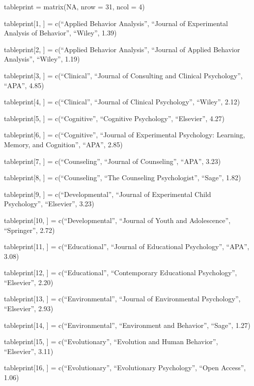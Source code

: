 \documentclass[english,man]{apa6}
\theoremstyle{definition}
\theoremstyle{definition}
\theoremstyle{definition}
\theoremstyle{remark}
\begin{document}
tableprint = matrix(NA, nrow = 31, ncol = 4)

tableprint{[}1, {]} = c(\enquote{Applied Behavior Analysis},
\enquote{Journal of Experimental Analysis of Behavior}, \enquote{Wiley},
1.39)

tableprint{[}2, {]} = c(\enquote{Applied Behavior Analysis},
\enquote{Journal of Applied Behavior Analysis}, \enquote{Wiley}, 1.19)

tableprint{[}3, {]} = c(\enquote{Clinical}, \enquote{Journal of
Consulting and Clinical Psychology}, \enquote{APA}, 4.85)

tableprint{[}4, {]} = c(\enquote{Clinical}, \enquote{Journal of Clinical
Psychology}, \enquote{Wiley}, 2.12)

tableprint{[}5, {]} = c(\enquote{Cognitive}, \enquote{Cognitive
Psychology}, \enquote{Elsevier}, 4.27)

tableprint{[}6, {]} = c(\enquote{Cognitive}, \enquote{Journal of
Experimental Psychology: Learning, Memory, and Cognition},
\enquote{APA}, 2.85)

tableprint{[}7, {]} = c(\enquote{Counseling}, \enquote{Journal of
Counseling}, \enquote{APA}, 3.23)

tableprint{[}8, {]} = c(\enquote{Counseling}, \enquote{The Counseling
Psychologist}, \enquote{Sage}, 1.82)

tableprint{[}9, {]} = c(\enquote{Developmental}, \enquote{Journal of
Experimental Child Psychology}, \enquote{Elsevier}, 3.23)

tableprint{[}10, {]} = c(\enquote{Developmental}, \enquote{Journal of
Youth and Adolescence}, \enquote{Springer}, 2.72)

tableprint{[}11, {]} = c(\enquote{Educational}, \enquote{Journal of
Educational Psychology}, \enquote{APA}, 3.08)

tableprint{[}12, {]} = c(\enquote{Educational}, \enquote{Contemporary
Educational Psychology}, \enquote{Elsevier}, 2.20)

tableprint{[}13, {]} = c(\enquote{Environmental}, \enquote{Journal of
Environmental Psychology}, \enquote{Elsevier}, 2.93)

tableprint{[}14, {]} = c(\enquote{Environmental}, \enquote{Environment
and Behavior}, \enquote{Sage}, 1.27)

tableprint{[}15, {]} = c(\enquote{Evolutionary}, \enquote{Evolution and
Human Behavior}, \enquote{Elsevier}, 3.11)

tableprint{[}16, {]} = c(\enquote{Evolutionary}, \enquote{Evolutionary
Psychology}, \enquote{Open Access}, 1.06)
\end{document}
